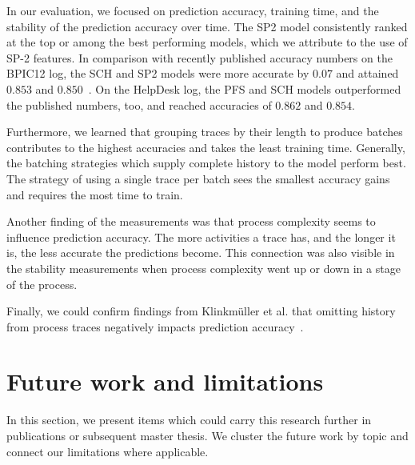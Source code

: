 In our evaluation, we focused on prediction accuracy, training time, and the stability of the prediction accuracy over time.
The SP2 model consistently ranked at the top or among the best performing models, which we attribute to the use of SP-2 features. In comparison with recently published accuracy numbers on the BPIC12 log, the SCH and SP2 models were more accurate by $0.07$ and attained $0.853$ and $0.850$~\cite{boehmer2018probability, evermann2016}.
On the HelpDesk log, the PFS and SCH models outperformed the published numbers, too, and reached accuracies of $0.862$ and $0.854$.

Furthermore, we learned that grouping traces by their length to produce batches contributes to the highest accuracies and takes the least training time.
Generally, the batching strategies which supply complete history to the model perform best.
The strategy of using a single trace per batch sees the smallest accuracy gains and requires the most time to train.

Another finding of the measurements was that process complexity seems to influence prediction accuracy.
The more activities a trace has, and the longer it is, the less accurate the predictions become.
This connection was also visible in the stability measurements when process complexity went up or down in a stage of the process.

Finally, we could confirm findings from Klinkmüller et al. that omitting history from process traces negatively impacts prediction accuracy~\cite{klinkmuller2018reliablemonitoring}.

\section{Future work and limitations}\label{sec:conclusion:future-work}
In this section, we present items which could carry this research further in publications or subsequent master thesis.
We cluster the future work by topic and connect our limitations where applicable.

